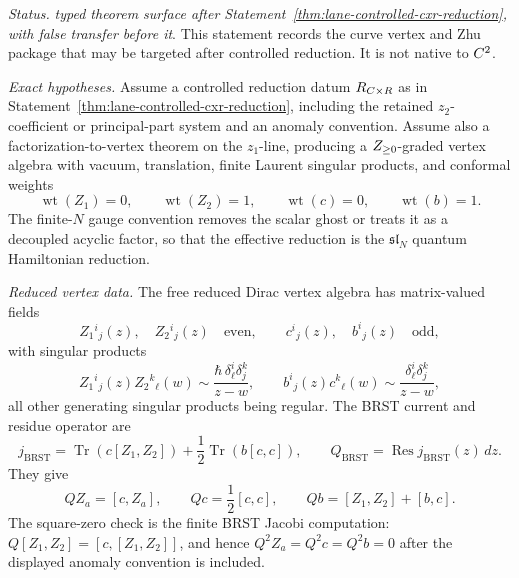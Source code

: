 \begin{stmt}\label{thm:lane-reduced-dirac-brst-zhu}
  \emph{Status.} \emph{typed theorem surface after
  Statement~\ref{thm:lane-controlled-cxr-reduction}, with false transfer
  before it}.  This statement records the curve vertex and Zhu package
  that may be targeted after controlled reduction.  It is not native to
  \(C^2\).

  \emph{Exact hypotheses.} Assume a controlled reduction datum
  \(R_{C\times R}\) as in
  Statement~\ref{thm:lane-controlled-cxr-reduction}, including the
  retained \(z_2\)-coefficient or principal-part system and an anomaly
  convention.  Assume also a factorization-to-vertex theorem on the
  \(z_1\)-line, producing a \(Z_{\ge0}\)-graded vertex algebra with
  vacuum, translation, finite Laurent singular products, and conformal
  weights
  \[
    \operatorname{wt}(Z_1)=0,\qquad
    \operatorname{wt}(Z_2)=1,\qquad
    \operatorname{wt}(c)=0,\qquad
    \operatorname{wt}(b)=1.
  \]
  The finite-\(N\) gauge convention removes the scalar ghost or treats it
  as a decoupled acyclic factor, so that the effective reduction is the
  \(\mathfrak{sl}_N\) quantum Hamiltonian reduction.

  \emph{Reduced vertex data.} The free reduced Dirac vertex algebra has
  matrix-valued fields
  \[
    Z_1{}^i{}_j(z),\quad Z_2{}^i{}_j(z)
    \quad\text{even},\qquad
    c^i{}_j(z),\quad b^i{}_j(z)
    \quad\text{odd},
  \]
  with singular products
  \[
    Z_1{}^i{}_j(z)Z_2{}^k{}_\ell(w)
    \sim
    \frac{\hbar\,\delta^i_\ell\delta^k_j}{z-w},
    \qquad
    b^i{}_j(z)c^k{}_\ell(w)
    \sim
    \frac{\delta^i_\ell\delta^k_j}{z-w},
  \]
  all other generating singular products being regular.  The BRST
  current and residue operator are
  \[
    j_{\mathrm{BRST}}
    =
    \operatorname{Tr}(c[Z_1,Z_2])
    +\frac12\operatorname{Tr}(b[c,c]),
    \qquad
    Q_{\mathrm{BRST}}=\operatorname{Res}j_{\mathrm{BRST}}(z)\,dz .
  \]
  They give
  \[
    QZ_a=[c,Z_a],\qquad
    Qc=\frac12[c,c],\qquad
    Qb=[Z_1,Z_2]+[b,c].
  \]
  The square-zero check is the finite BRST Jacobi computation:
  \(Q[Z_1,Z_2]=[c,[Z_1,Z_2]]\), and hence
  \(Q^2Z_a=Q^2c=Q^2b=0\) after the displayed anomaly convention is
  included.


\end{stmt}
